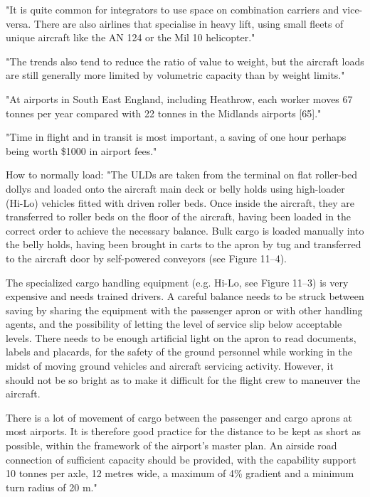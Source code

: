 "It is quite common for integrators to use space on combination carriers and vice-versa. There are also airlines that specialise in heavy lift, using small fleets of unique aircraft like the AN 124 or the Mil 10 helicopter."


"The trends also tend to reduce the ratio of value to weight, but the aircraft loads are still generally more limited by volumetric capacity than by weight limits."


"At airports in South East England, including Heathrow, each worker moves 67 tonnes per year compared with 22 tonnes in the Midlands airports [65]."


"Time in flight and in transit is most important, a saving of one hour perhaps being worth \$1000 in airport fees."


How to normally load:
"The ULDs are taken from the terminal on flat roller-bed dollys and loaded onto the aircraft main deck or belly holds using high-loader (Hi-Lo) vehicles fitted with driven roller beds.
Once inside the aircraft, they are transferred to roller beds on the floor of the aircraft, having been loaded in the correct order to achieve the necessary balance. Bulk cargo is loaded manually into the belly holds, having been brought in carts to the apron by tug and transferred to the aircraft door by self-powered conveyors (see Figure 11–4).

The specialized cargo handling equipment (e.g. Hi-Lo, see Figure 11–3) is very expensive and needs trained drivers. A careful balance needs to be struck between saving by sharing the equipment with the passenger apron or with other handling agents, and the possibility of letting the level of service slip below acceptable levels.
There needs to be enough artificial light on the apron to read documents, labels and placards, for the safety of the ground personnel while working in the midst of moving ground vehicles and aircraft servicing activity. However, it should not be so bright as to make it difficult for the flight crew to maneuver the aircraft.

There is a lot of movement of cargo between the passenger and cargo aprons at most airports.
It is therefore good practice for the distance to be kept as short as possible, within the framework of the airport’s master plan. An airside road connection of sufficient capacity should be provided, with the capability support 10 tonnes per axle, 12 metres wide, a maximum of 4\% gradient and a minimum turn radius of 20 m."


